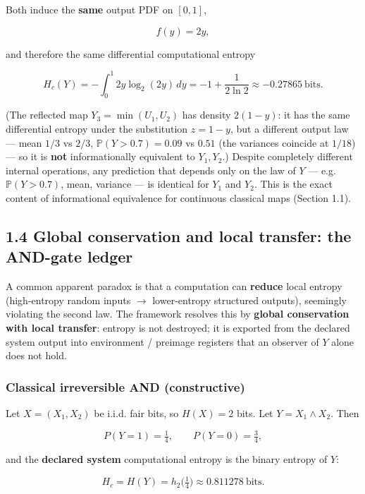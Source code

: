 \documentclass[
  11pt,
]{article}
\begin{document}
Both induce the \textbf{same} output PDF on \([0,1]\),

\[
f(y)=2y,
\]

and therefore the same differential computational entropy

\[
H_c(Y)=-\int_0^1 2y\log_2(2y)\,dy = -1+\frac{1}{2\ln 2}\approx -0.27865\ \mathrm{bits}.
\]

(The reflected map \(Y_3=\min(U_1,U_2)\) has density \(2(1-y)\): it has the same differential entropy under the substitution \(z=1-y\), but a different output law --- mean \(1/3\) vs \(2/3\), \(\mathbb{P}(Y>0.7)=0.09\) vs \(0.51\) (the variances coincide at \(1/18\)) --- so it is \textbf{not} informationally equivalent to \(Y_1,Y_2\).) Despite completely different internal operations, any prediction that depends only on the law of \(Y\) --- e.g.~\(\mathbb{P}(Y>0.7)\), mean, variance --- is identical for \(Y_1\) and \(Y_2\). This is the
exact content of informational equivalence for continuous classical maps
(Section 1.1).

\subsection{1.4 Global conservation and local transfer: the AND-gate
ledger}\label{global-conservation-and-local-transfer-the-and-gate-ledger}

A common apparent paradox is that a computation can \textbf{reduce}
local entropy (high-entropy random inputs $\to$ lower-entropy structured
outputs), seemingly violating the second law. The framework resolves
this by \textbf{global conservation with local transfer}: entropy is not
destroyed; it is exported from the declared system output into
environment / preimage registers that an observer of \(Y\) alone does
not hold.

\subsubsection{Classical irreversible AND
(constructive)}\label{classical-irreversible-and-constructive}

Let \(X=(X_1,X_2)\) be i.i.d. fair bits, so \(H(X)=2\) bits. Let
\(Y=X_1\land X_2\). Then

\[
P(Y=1)=\tfrac14,\qquad P(Y=0)=\tfrac34,
\]

and the \textbf{declared system} computational entropy is the binary
entropy of \(Y\):

\[
H_c = H(Y) = h_2\bigl(\tfrac14\bigr)\approx 0.811278\ \mathrm{bits}.
\]
\end{document}
